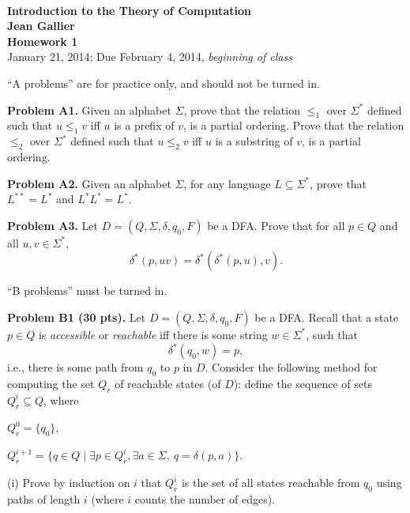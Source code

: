\documentclass[12pt]{article}
\begin{document}
\begin{center}
\\
\vspace{1cm}
{\Large\bf Introduction to the Theory of Computation\\
Jean Gallier \\
\vspace{0.5cm}
Homework 1}\\[10pt]
January 21, 2014; Due February 4, 2014, {\it beginning of class}\\
\end{center}

``A problems'' are for practice only, and should not
be turned in.

\medskip\noindent
{\bf Problem A1.} 
Given an alphabet $\Sigma$, prove
that the relation $\leq_1$ over $\Sigma^*$ defined such that
$u \leq_1 v$ iff $u$ is a prefix of $v$, is a partial ordering.
Prove that the relation $\leq_2$ over $\Sigma^*$ defined such that
$u \leq_2 v$ iff $u$ is a substring of $v$, is a partial ordering.


\medskip\noindent
{\bf Problem A2.} 
Given an alphabet $\Sigma$, for any language $L\subseteq \Sigma^*$,
prove that $L^{**} = L^*$ and $L^*L^* = L^*$.

\vspace {0.5cm}\noindent
{\bf Problem A3.} 
Let $D = (Q,\Sigma,\delta,q_0,F)$ be a DFA.
Prove that for all $p\in Q$ and all $u, v\in \Sigma^*$,
\[
\delta^*(p, uv) = \delta^*(\delta^*(p, u), v).
\]

\vspace {0.5cm}
``B problems'' must be turned in.

\vspace {0.25cm}\noindent
{\bf Problem B1 (30 pts).} 
Let $D = (Q,\Sigma,\delta,q_0,F)$ be a DFA.
Recall that a state $p\in Q$ is {\it accessible\/} or {\it reachable\/}
iff there is some string $w\in\Sigma^*$, such that
$$\delta^{*}(q_0,w) = p,$$
i.e., there is some path from $q_0$ to $p$ in $D$.
Consider the following method for computing the set $Q_{r}$ of
reachable states (of $D$): define the sequence of sets
$Q_{r}^{i}\subseteq Q$, where

\medskip
$Q_{r}^{0} = \{q_0\}$,
 
\medskip
$Q_{r}^{i+1} = \{q\in Q \mid \exists p\in Q_{r}^{i}, \exists a\in\Sigma,\>
q = \delta(p,a)\}$.

\medskip
(i) Prove by induction on $i$ that $Q_{r}^{i}$ is the set of
all states reachable from $q_0$ using paths of length $i$
(where $i$ counts the number of edges).
\end{document}
